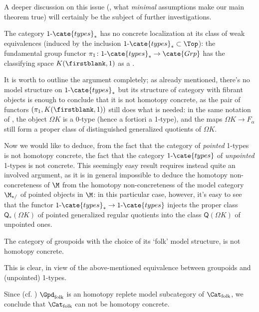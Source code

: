 A deeper discussion on this issue (\ie, what \emph{minimal} assumptions make our main theorem true) will certainly be the subject of further investigations.
\begin{example}\label{uno-tipi}
The category $1\text{-}\cate{types}_*$ has no concrete localization at its class of weak equivalences (induced by the inclusion $1\text{-}\cate{types}_*\subset\Top$): the fundamental group functor $\pi_1\colon 1\text{-}\cate{types}_* \to \cate{Grp}$ has the classifying space $K(\firstblank,1)$ as a \wco.
\end{example}
It is worth to outline the argument completely; as already mentioned, there's no model structure on $1\text{-}\cate{types}_*$ but its structure of category with fibrant objects is enough to conclude that it is not homotopy concrete, as the pair of functors $(\pi_1,K(\firstblank,1))$ still does what is needed: in the same notation of \athm{}, the object $\Omega K$ is a 0-type (hence a fortiori a 1-type), and the maps $\Omega K \to F_\alpha$ still form a proper class of distinguished generalized quotients of $\Omega K$.

Now we would like to deduce, from the fact that the category of \emph{pointed} 1-types is not homotopy concrete, the fact that the category $1\text{-}\cate{types}$ of \emph{unpointed} 1-types is not concrete. This seemingly easy result requires instead quite an involved argument, as it is in general impossible to deduce the homotopy non-concreteness of $\M$ from the homotopy non-concreteness of the model category $\M_{*/}$ of pointed objects in $\M$: in this particular case, however, it's easy to see that the functor $1\text{-}\cate{types}_* \to 1\text{-}\cate{types}$ injects the proper class $\mathsf{Q}_*(\Omega K)$ of pointed generalized regular quotients into the class $\mathsf{Q}(\Omega K)$ of unpointed ones.
\begin{corollary}
The category of groupoids with the choice of its `folk' model structure, is not homotopy concrete.%
\end{corollary}
This is clear, in view of the above-mentioned equivalence between groupoids and (unpointed) 1-types.
\begin{corollary}
Since (cf. ) $\Gpd_\text{folk}$ is an homotopy replete model subcategory of $\Cat_\text{folk}$, we conclude that $\Cat_\text{folk}$ can not be homotopy concrete.
\end{corollary}

